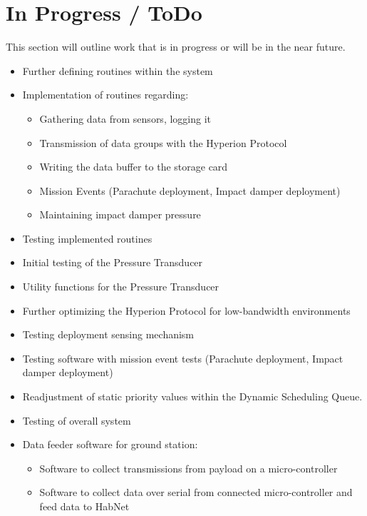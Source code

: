 \documentclass[11pt]{article}
\begin{document}
\section{In Progress / ToDo}
This section will outline work that is in progress or will be in the near future. 
\begin{itemize}
	\item Further defining routines within the system
	\item Implementation of routines regarding:
	\begin{itemize}
		\item Gathering data from sensors, logging it
		\item Transmission of data groups with the Hyperion Protocol
		\item Writing the data buffer to the storage card
		\item Mission Events (Parachute deployment, Impact damper deployment)
		\item Maintaining impact damper pressure
	\end{itemize}
	\item Testing implemented routines
	\item Initial testing of the Pressure Transducer 
	\item Utility functions for the Pressure Transducer 
	\item Further optimizing the Hyperion Protocol for low-bandwidth environments
	\item Testing deployment sensing mechanism 
	\item Testing software with mission event tests (Parachute deployment, Impact damper deployment)
	\item Readjustment of static priority values within the Dynamic Scheduling Queue.
	\item Testing of overall system
	\item Data feeder software for ground station:
	\begin{itemize}
		\item Software to collect transmissions from payload on a micro-controller 
		\item Software to collect data over serial from connected micro-controller and feed data to HabNet
	\end{itemize}
\end{itemize}
\end{document}
